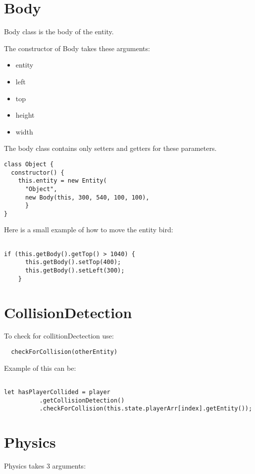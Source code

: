 \section{Body}
Body class is the body of the entity.  

The constructor of Body takes these arguments:

\begin{itemize}
	\item entity
    \item left
    \item top
    \item height
    \item width
\end{itemize}

The body class contains only setters and getters for these parameters.

\begin{lstlisting}
class Object {
  constructor() {
    this.entity = new Entity(
      "Object",
      new Body(this, 300, 540, 100, 100),
      }
}
\end{lstlisting}

Here is a small example of how to move the entity bird:
\begin{lstlisting}

if (this.getBody().getTop() > 1040) {
      this.getBody().setTop(400);
      this.getBody().setLeft(300);
    }
\end{lstlisting}

\section{CollisionDetection}
To check for collitionDectection use:
\begin{lstlisting}
  checkForCollision(otherEntity)
\end{lstlisting}

Example of this can be:
\begin{lstlisting}

let hasPlayerCollided = player
          .getCollisionDetection()
          .checkForCollision(this.state.playerArr[index].getEntity());
\end{lstlisting}


\section{Physics}

Physics takes 3 arguments:

